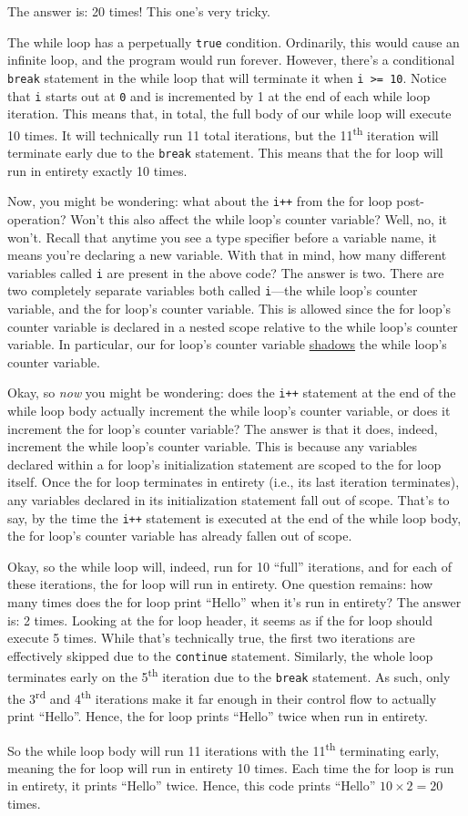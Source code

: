 \documentclass{article}
\begin{document}
The answer is: 20 times! This one's very tricky.

The while loop has a perpetually \texttt{true} condition. Ordinarily, this would cause an infinite loop, and the program would run forever. However, there's a conditional \texttt{break} statement in the while loop that will terminate it when \texttt{i >= 10}. Notice that \texttt{i} starts out at \texttt{0} and is incremented by 1 at the end of each while loop iteration. This means that, in total, the full body of our while loop will execute 10 times. It will technically run 11 total iterations, but the 11\textsuperscript{th} iteration will terminate early due to the \texttt{break} statement. This means that the for loop will run in entirety exactly 10 times.

Now, you might be wondering: what about the \texttt{i++} from the for loop post-operation? Won't this also affect the while loop's counter variable? Well, no, it won't. Recall that anytime you see a type specifier before a variable name, it means you're declaring a new variable. With that in mind, how many different variables called \texttt{i} are present in the above code? The answer is two. There are two completely separate variables both called \texttt{i}---the while loop's counter variable, and the for loop's counter variable. This is allowed since the for loop's counter variable is declared in a nested scope relative to the while loop's counter variable. In particular, our for loop's counter variable \ul{shadows} the while loop's counter variable.

Okay, so \textit{now} you might be wondering: does the \texttt{i++} statement at the end of the while loop body actually increment the while loop's counter variable, or does it increment the for loop's counter variable? The answer is that it does, indeed, increment the while loop's counter variable. This is because any variables declared within a for loop's initialization statement are scoped to the for loop itself. Once the for loop terminates in entirety (i.e., its last iteration terminates), any variables declared in its initialization statement fall out of scope. That's to say, by the time the \texttt{i++} statement is executed at the end of the while loop body, the for loop's counter variable has already fallen out of scope.

Okay, so the while loop will, indeed, run for 10 ``full'' iterations, and for each of these iterations, the for loop will run in entirety. One question remains: how many times does the for loop print ``Hello'' when it's run in entirety? The answer is: 2 times. Looking at the for loop header, it seems as if the for loop should execute 5 times. While that's technically true, the first two iterations are effectively skipped due to the \texttt{continue} statement. Similarly, the whole loop terminates early on the 5\textsuperscript{th} iteration due to the \texttt{break} statement. As such, only the 3\textsuperscript{rd} and 4\textsuperscript{th} iterations make it far enough in their control flow to actually print ``Hello''. Hence, the for loop prints ``Hello'' twice when run in entirety.

So the while loop body will run 11 iterations with the 11\textsuperscript{th} terminating early, meaning the for loop will run in entirety 10 times. Each time the for loop is run in entirety, it prints ``Hello'' twice. Hence, this code prints ``Hello'' $10 \times 2 = 20$ times.
\end{document}
